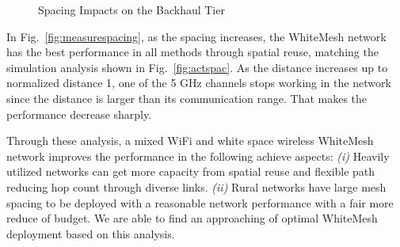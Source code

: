 \begin{figure}[t]
\centering
{}
\hfill
\caption{Spacing Impacts on the Backhaul Tier}
\label{fig:all3figs}
\vspace{-0.3in}
\end{figure}

In Fig.~\ref{fig:measurespacing}, as the spacing increases, the WhiteMesh network 
has the best performance in all methods through spatial reuse, matching the simulation 
analysis shown in Fig.~\ref{fig:actspac}. As the distance increases up to normalized 
distance 1, one of the 5 GHz channels stops working in the network since the distance 
is larger than its communication range. That makes the performance decrease sharply.

Through these analysis, a mixed WiFi and white space wireless WhiteMesh network 
improves the performance in the following achieve aspects: 
{\it (i)} Heavily utilized networks can get more capacity from spatial reuse and 
flexible path reducing hop count through diverse links. 
{\it (ii)} Rural networks have large mesh spacing to be deployed with a reasonable network performance 
with a fair more reduce of budget.
We are able to find an approaching of optimal WhiteMesh deployment based on this 
analysis.

